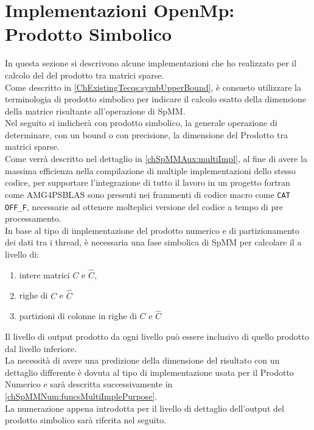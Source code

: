 \chapter{Implementazioni OpenMp: Prodotto Simbolico}
\label{ChSymbProduct}\label{chSpMMSymb}
In questa sezione si descrivono alcune implementazioni che ho realizzato per il calcolo del 
\nnnz del prodotto tra matrici sparse.\\
Come descritto in \ref{ChExistingTecqs:symbUpperBound}, è consueto utilizzare la terminologia di prodotto simbolico
per indicare il calcolo esatto della dimensione della matrice risultante all'operazione di SpMM.\\
Nel seguito si indicherà con prodotto simbolico, la generale operazione di determinare, 
con un bound o con precisione, la dimensione del Prodotto tra matrici sparse.\\
Come verrà descritto nel dettaglio in \ref{chSpMMAux:multiImpl}, 
al fine di avere la massima efficienza nella compilazione 
di multiple implementazioni dello stesso codice, per supportare l'integrazione 
di tutto il lavoro in un progetto fortran come AMG4PSBLAS  \amgforpsblas 
sono presenti nei frammenti di codice macro come \verb|CAT OFF_F|,
necessarie ad ottenere molteplici versione del codice a tempo di pre processamento.\\

\label{chSpMMSymb:outputDetailLevel} %
In base al tipo di implementazione del prodotto numerico e di partizionamento dei dati tra i thread,
è necessaria una fase simbolica di SpMM per calcolare il \nnnz a livello di:\\
\begin{enumerate}
	\item	
		intere matrici $C$ e $\hat{C}$,\\
	\item 	righe di $C$ e $\hat{C}$
	\item 	partizioni di colonne in righe di $C$ e $\hat{C}$
\end{enumerate}
Il livello di output prodotto da ogni livello può essere inclusivo di quello prodotto dal livello inferiore.\\
La necessità di avere una predizione della dimensione del risultato con un dettaglio differente 
è dovuta al tipo di implementazione usata per il Prodotto Numerico e 
sarà descritta successivamente in \ref{chSpMMNum:funcsMultiImplePurpose}.\\
La numerazione appena introdotta per il livello di dettaglio dell'output del prodotto simbolico 
sarà riferita nel seguito.\\

